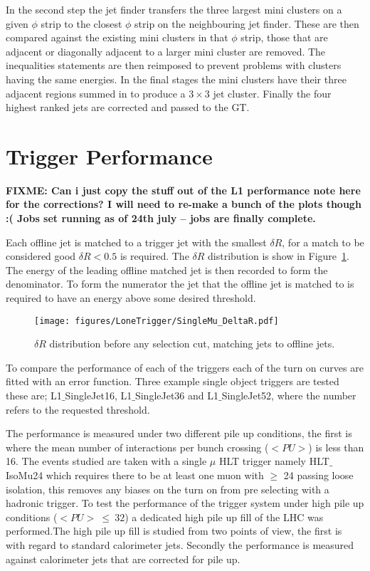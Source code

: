 In the second step the jet finder transfers the three largest mini clusters on 
a given $\phi$ strip to the closest $\phi$ strip on the neighbouring jet finder.
These are then compared against the existing mini clusters in that $\phi$ strip,
those that are adjacent or diagonally adjacent to a larger mini cluster are 
removed. The inequalities statements are then reimposed to prevent problems
with clusters having the same energies. In the final stages the mini clusters
have their three adjacent regions summed in to produce a $3 \times 3$ jet
cluster. Finally the four highest ranked jets are corrected and passed to the 
GT.

\section{\Lone Trigger Performance} %
\label{sec:lone_trigger_performance}
\textbf{FIXME: Can i just copy the stuff out of the L1 performance note here 
for the corrections? I will need to re-make a bunch of the plots though :( Jobs 
set running as of 24th july -- jobs are finally complete.}


Each offline jet is matched to a \Lone trigger jet with the smallest $\delta 
R$, for a match to be considered good $\delta R < 0.5$ is required. The $\delta 
R$ distribution is show in Figure~\ref{fig:figures_LoneTrigger_SingleMu_DeltaR}.
The energy of the leading offline matched jet is then recorded to form the 
denominator. To form the numerator the \Lone jet that the offline jet is 
matched to is required to have an energy above some desired threshold.

\begin{figure}[ht!]
  \centering
    \texttt{[image: figures/LoneTrigger/SingleMu\_DeltaR.pdf]}
  \caption{$\delta R$ distribution before any selection cut, matching \Lone 
  jets to offline jets.}
  \label{fig:figures_LoneTrigger_SingleMu_DeltaR}
\end{figure}


To compare the performance of each of the triggers each of the turn on curves
are fitted with an error function. Three example single object triggers are 
tested these are; L1$\_$SingleJet16, L1$\_$SingleJet36 and L1$\_$SingleJet52, 
where the number refers to the requested \ET threshold.

The performance is measured under two different pile up conditions, the first
is where the mean number of interactions per bunch crossing ($<PU>$) is less 
than 16. The events studied are taken with a single $\mu$ HLT trigger namely
HLT$\_$IsoMu24 which requires there to be at least one muon with \PT $\geq$ 24 
\GeV passing loose isolation, this removes any biases on the turn on from pre 
selecting with a hadronic trigger. To test the performance of the trigger 
system under high pile up conditions ($<PU> ~ \leq ~ 32$) a dedicated high pile 
up fill of the LHC was performed.The high pile up fill is studied from two 
points of view, the first is with regard to standard \AK calorimeter jets. 
Secondly the performance is measured against \AK calorimeter jets that are 
corrected for pile up.


